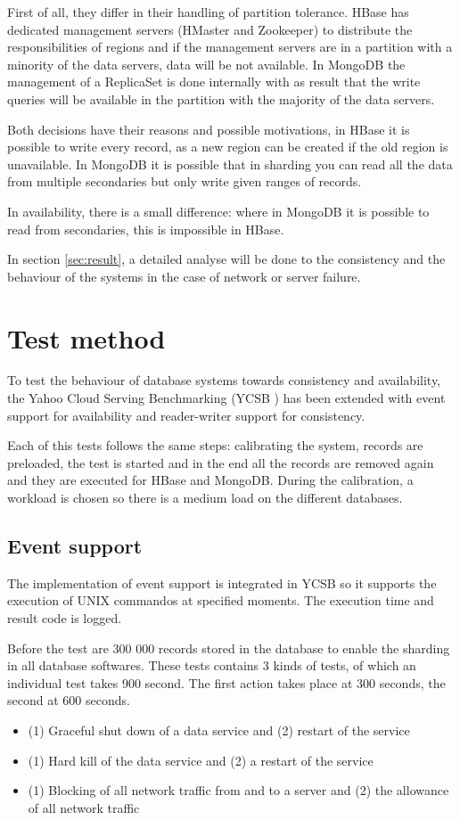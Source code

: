 \documentclass[10pt,conference,letterpaper]{IEEEtran}
\begin{document}
First of all, they differ in their handling of partition tolerance. HBase has dedicated management servers (HMaster and Zookeeper) to distribute the responsibilities of regions and if the management servers are in a partition with a minority of the data servers, data will be not available. In MongoDB the management of a ReplicaSet is done internally with as result that the write queries will be available in the partition with the majority of the data servers.

Both decisions have their reasons and possible motivations, in HBase it is possible to write every record, as a new region can be created if the old region is unavailable. In MongoDB it is possible that in sharding you can read all the data from multiple secondaries but only write given ranges of records.

In availability, there is a small difference: where in MongoDB it is possible to read from secondaries, this is impossible in HBase. 

In section \ref{sec:result}, a detailed analyse will be done to the consistency and the behaviour of the systems in the case of network or server failure. 

\section{Test method}\label{sec:testmethod}
To test the behaviour of database systems towards consistency and availability, the Yahoo Cloud Serving Benchmarking (YCSB \cite{cooper2010benchmarking}) has been extended with event support for availability and reader-writer support for consistency.

Each of this tests follows the same steps: calibrating the system, records are preloaded, the test is started and in the end all the records are removed again and they are executed for HBase and MongoDB. During the calibration, a workload is chosen so there is a medium load on the different databases. 

\subsection{Event support}
The implementation of event support is integrated in YCSB so it supports the execution of UNIX commandos at specified moments. The execution time and result code is logged. 

Before the test are 300 000 records stored in the database to enable the sharding in all database softwares. These tests contains 3 kinds of tests, of which an individual test takes 900 second. The first action takes place at 300 seconds, the second at 600 seconds.
\begin{itemize}
\item (1) Graceful shut down of a data service and (2) restart of the service
\item (1) Hard kill of the data service and (2) a restart of the service
\item (1) Blocking of all network traffic from and to a server and (2) the allowance of all network traffic
\end{itemize}
\end{document}
